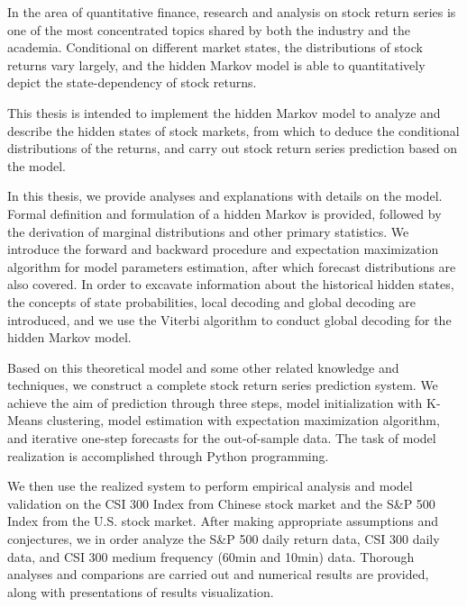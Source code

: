 
\begin{bigabstract}

In the area of quantitative finance,
research and analysis on stock return series is one of the most concentrated topics 
shared by both the industry and the academia.
Conditional on different market states,
the distributions of stock returns vary largely,
and the hidden Markov model is able to quantitatively depict the state-dependency of stock returns.

This thesis is intended to implement the hidden Markov model to 
analyze and describe the hidden states of stock markets,
from which to deduce the conditional distributions of the returns,
and carry out stock return series prediction based on the model.

In this thesis, 
we provide analyses and explanations with details on the model.
Formal definition and formulation of a hidden Markov is provided,
followed by the derivation of marginal distributions and other primary statistics.
We introduce the forward and backward procedure and 
expectation maximization algorithm for model parameters estimation,
after which forecast distributions are also covered.
In order to excavate information about the historical hidden states,
the concepts of state probabilities, local decoding and global decoding are introduced,
and we use the Viterbi algorithm to conduct global decoding for the hidden Markov model.

Based on this theoretical model and some other related knowledge and techniques,
we construct a complete stock return series prediction system.
We achieve the aim of prediction through three steps,
model initialization with K-Means clustering,
model estimation with expectation maximization algorithm,
and iterative one-step forecasts for the out-of-sample data.
The task of model realization is accomplished through Python programming.

We then use the realized system to perform empirical analysis and model validation 
on the CSI 300 Index from Chinese stock market and the S\&P 500 Index from the U.S. stock market.
After making appropriate assumptions and conjectures,
we in order analyze the S\&P 500 daily return data, CSI 300 daily data,
and CSI 300 medium frequency (60min and 10min) data.
Thorough analyses and comparions are carried out and numerical results are provided,
along with presentations of results visualization.


\end{bigabstract}

